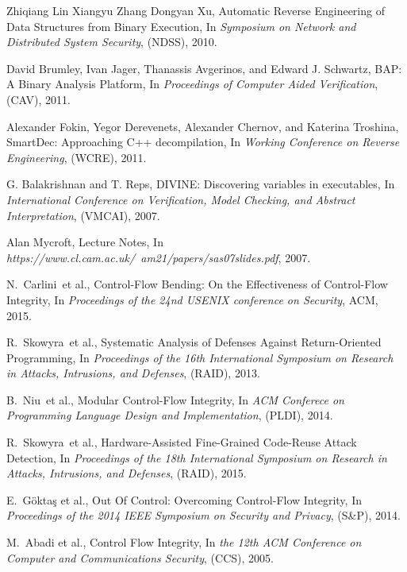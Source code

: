 \documentclass[11pt,a4paper,bibtotoc,idxtotoc,headsepline,footsepline,footexclude,BCOR12mm,DIV13]{scrbook}
\begin{document}
\begin{thebibliography}{30}
Zhiqiang Lin Xiangyu Zhang Dongyan Xu,
{Automatic Reverse Engineering of Data Structures from Binary Execution}, In
\emph{Symposium on Network and Distributed System Security}, (NDSS), 2010.

David Brumley, Ivan Jager, Thanassis Avgerinos, and Edward J. Schwartz,
{BAP: A Binary Analysis Platform}, 
In \emph{Proceedings of Computer Aided Verification}, (CAV), 2011.

Alexander Fokin, Yegor Derevenets, Alexander Chernov, and Katerina Troshina,
{SmartDec: Approaching C++ decompilation}, 
In \emph{Working Conference on Reverse Engineering}, (WCRE), 2011.

G. Balakrishnan and T. Reps,
{DIVINE: Discovering variables in executables}, 
In \emph{International Conference on Verification, Model Checking, and Abstract Interpretation}, (VMCAI), 2007.

Alan Mycroft,
{Lecture Notes}, 
In \emph{https://www.cl.cam.ac.uk/~am21/papers/sas07slides.pdf}, 2007.









N.~Carlini~et al., {Control-Flow Bending: On the Effectiveness of Control-Flow Integrity}, In
\emph{Proceedings of the 24nd USENIX conference on Security}, ACM, 2015.

R.~Skowyra~et al., {Systematic Analysis of Defenses Against Return-Oriented Programming}, In
\emph{Proceedings of the 16th International Symposium on Research in Attacks, Intrusions, and Defenses},
(RAID), 2013.

B.~Niu~et al., {Modular Control-Flow Integrity}, In
\emph{ACM Conferece on Programming Language Design and Implementation}, (PLDI), 2014.

R.~Skowyra~et al., {Hardware-Assisted Fine-Grained Code-Reuse Attack Detection}, In
\emph{Proceedings of the 18th International Symposium on Research in Attacks, Intrusions, and Defenses},
(RAID), 2015.

E.~G\"{o}kta\c{s} et al., {Out Of Control: Overcoming Control-Flow Integrity}, In
\emph{Proceedings of the 2014 IEEE Symposium on Security and Privacy}, (S\&P), 2014.

M.~Abadi et al., {Control Flow Integrity}, In
\emph{the 12th ACM Conference on Computer and Communications Security}, (CCS), 2005.


\end{thebibliography}
\end{document}
